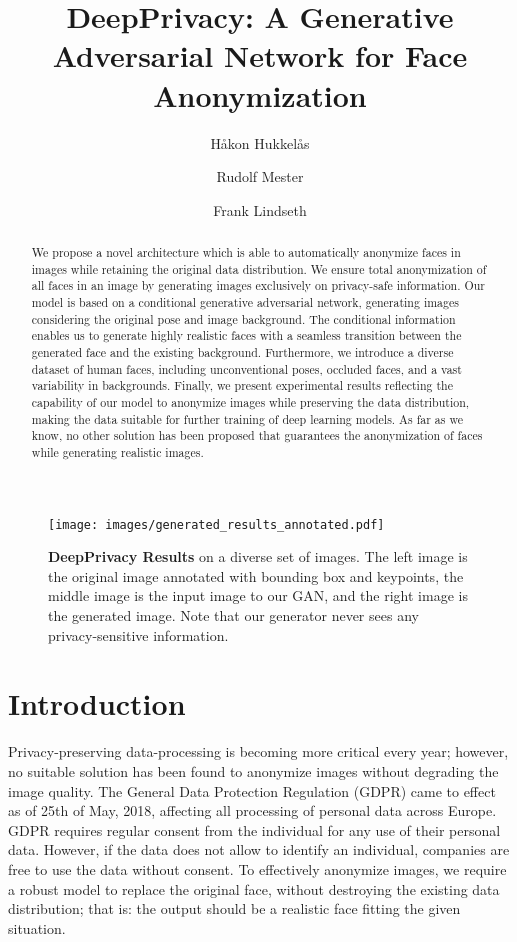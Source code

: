 \documentclass[runningheads]{llncs}
\title{DeepPrivacy: A Generative Adversarial Network for Face Anonymization}
\author{H\aa kon Hukkel\aa s \orcidID{0000-0001-9830-4931} \and
	Rudolf Mester \orcidID{0000-0002-6932-0606} \and
	Frank Lindseth \orcidID{0000-0002-4979-9218}}
\institute{Department of Computer Science\\
	Norwegian University of Science and Technology\\
	Trondheim, Norway \\
	\email{\{hakon.hukkelas, rudolf.mester, frankl\}@ntnu.no}}
\begin{document}
\maketitle              \begin{abstract}

We propose a novel architecture which is able to automatically anonymize faces in images while retaining the original data distribution. 
We ensure total anonymization of all faces in an image by generating images exclusively on privacy-safe information.
Our model is based on a conditional generative adversarial network, generating images considering the original pose and image background. The conditional information enables us to generate highly realistic faces with a seamless transition between the generated face and the existing background. 
Furthermore, we introduce a diverse dataset of human faces, including unconventional poses, occluded faces, and a vast variability in backgrounds. 
Finally, we present experimental results reflecting the capability of our model to anonymize images while preserving the data distribution, making the data suitable for further training of deep learning models. 
As far as we know, no other solution has been proposed that guarantees the anonymization of faces while generating realistic images.


\end{abstract}

\begin{figure}[h]
    \centering
    \texttt{[image: images/generated\_results\_annotated.pdf]}
    \caption{\textbf{DeepPrivacy Results} on a diverse set of images. The left image is the original image annotated with bounding box and keypoints, the middle image is the input image to our GAN, and the right image is the generated image. Note that our generator never sees any privacy-sensitive information.}
    \label{fig:annotated_results}
\end{figure}
\section{Introduction}

Privacy-preserving data-processing is becoming more critical every year; however, no suitable solution has been found to anonymize images without degrading the image quality. 
The General Data Protection Regulation (GDPR) came to effect as of 25th of May, 2018, affecting all processing of personal data across Europe.
GDPR requires regular consent from the individual for any use of their personal data. However, if the data  does not allow to identify an individual, companies are free to use the data without consent. To effectively anonymize images, we require a robust model to replace the original face, without destroying the existing data distribution; that is: the output should be a realistic face fitting the given situation. 
\end{document}
